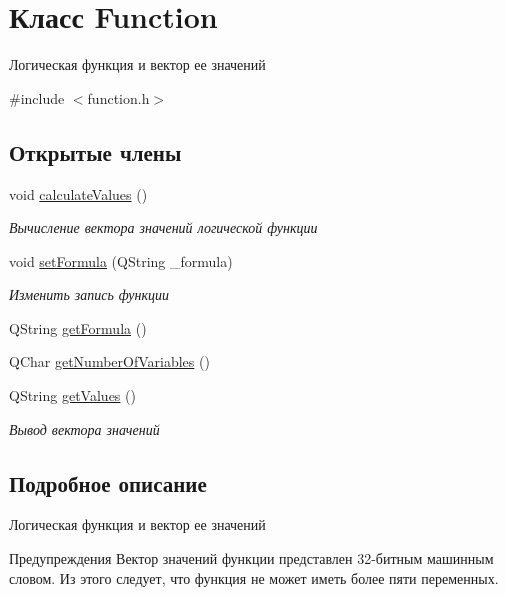 \hypertarget{class_function}{}\section{Класс Function}
\label{class_function}


Логическая функция и вектор ее значений  




{\ttfamily \#include $<$function.\+h$>$}

\subsection*{Открытые члены}
\begin{DoxyCompactItemize}
\item 
void \hyperlink{class_function_a6442bf1b8534028339904204a5b56949}{calculate\+Values} ()
\begin{DoxyCompactList}\small\item\em Вычисление вектора значений логической функции \end{DoxyCompactList}\item 
void \hyperlink{class_function_a027f157bb949b9598b08db6596c3e291}{set\+Formula} (Q\+String \+\_\+formula)
\begin{DoxyCompactList}\small\item\em Изменить запись функции \end{DoxyCompactList}\item 
Q\+String \hyperlink{class_function_af9036d1aabffcd855c0d3e4981ec7f0a}{get\+Formula} ()
\item 
Q\+Char \hyperlink{class_function_a87ff969fd64a5dcdacdca843a3dc13fb}{get\+Number\+Of\+Variables} ()
\item 
Q\+String \hyperlink{class_function_a23aa5c7ecc12e85f6cf7d175394d3a64}{get\+Values} ()
\begin{DoxyCompactList}\small\item\em Вывод вектора значений \end{DoxyCompactList}\end{DoxyCompactItemize}


\subsection{Подробное описание}
Логическая функция и вектор ее значений 

\begin{DoxyWarning}{Предупреждения}
Вектор значений функции представлен 32-\/битным машинным словом. Из этого следует, что функция не может иметь более пяти переменных. 
\end{DoxyWarning}


